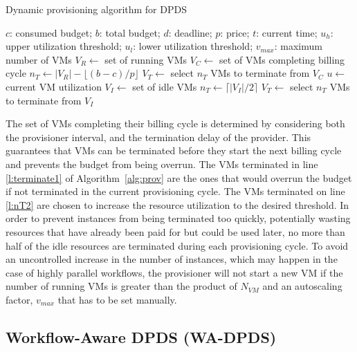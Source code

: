 \documentclass{sig-alternate}
\begin{document}
\begin{algorithm}
\caption{Dynamic provisioning algorithm for DPDS}
\label{alg:prov}
\begin{algorithmic}[1]
\Require $c$: consumed budget; $b$: total budget; $d$: deadline; $p$: price;
$t$: current time; $u_h$: upper utilization threshold; $u_l$: lower utilization
threshold; $v_{max}$: maximum number of VMs
	\State $V_R\gets$ set of running VMs
    \State $V_C\gets$ set of VMs completing billing cycle
    	\State $n_T\gets |V_R| - \lfloor(b-c)/p\rfloor$
    	\State $V_T\gets$ select $n_T$ VMs to terminate from $V_C$
    	\State {} \label{l:terminate1}
    \Else 
		\State $u\gets$ current VM utilization
    		\State {}
    		\State $V_I\gets$ set of idle VMs
    		\State $n_T\gets \lceil|V_I|/2\rceil$ \label{l:nT2}
			\State $V_T\gets$ select $n_T$ VMs to terminate from $V_I$
    		\State {} \label{l:terminate2}
    	\EndIf 
    \EndIf
\EndProcedure
\end{algorithmic} 
\end{algorithm}

The set of VMs completing their billing cycle is determined by considering both the
provisioner interval, and the termination delay of the provider. This guarantees 
that VMs can be terminated before they start the next billing cycle and prevents the
budget from being overrun. The VMs terminated in line \ref{l:terminate1} of Algorithm~\ref{alg:prov} are the ones 
that would overrun the budget if not terminated in the current provisioning cycle. 
The VMs terminated on line \ref{l:nT2} are chosen to increase the resource utilization
to the desired threshold. In order to prevent instances from being
terminated too quickly, potentially wasting resources that have already been paid for
but could be used later, no more than half of the idle resources are terminated during
each provisioning cycle. To avoid an uncontrolled increase in the number of
instances, which may happen in the case of highly parallel workflows, the provisioner 
will not start a new VM if the number of running VMs is greater than the product of
$N_{VM}$ and an autoscaling factor, $v_{max}$ that has to be set manually.


\subsection{Workflow-Aware DPDS (WA-DPDS)}
\end{document}
